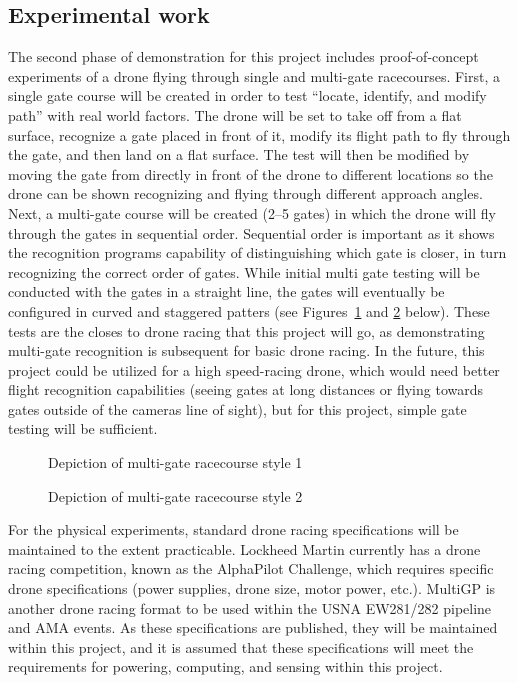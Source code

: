 \documentclass[onecolumn,10pt]{IEEEtran}
\begin{document}
\subsection{Experimental work}
The second phase of demonstration for this project includes proof-of-concept experiments of a drone flying through single and multi-gate racecourses. First, a single gate course will be created in order to test ``locate, identify, and modify path'' with real world factors. The drone will be set to take off from a flat surface, recognize a gate placed in front of it, modify its flight path to fly through the gate, and then land on a flat surface. The test will then be modified by moving the gate from directly in front of the drone to different locations so the drone can be shown recognizing and flying through different approach angles. Next, a multi-gate course will be created (2--5 gates) in which the drone will fly through the gates in sequential order. Sequential order is important as it shows the recognition programs capability of distinguishing which gate is closer, in turn recognizing the correct order of gates.  While initial multi gate testing will be conducted with the gates in a straight line, the gates will eventually be configured in curved and staggered patters (see Figures~\ref{fig-gate-style-1} and \ref{fig-gate-style-2} below). These tests are the closes to drone racing that this project will go, as demonstrating multi-gate recognition is subsequent for basic drone racing. In the future, this project could be utilized for a high speed-racing drone, which would need better flight recognition capabilities (seeing gates at long distances or flying towards gates outside of the cameras line of sight), but for this project, simple gate testing will be sufficient.
\begin{figure}
\caption{Depiction of multi-gate racecourse style 1}
\label{fig-gate-style-1}
\end{figure}

\begin{figure}
\caption{Depiction of multi-gate racecourse style 2}
\label{fig-gate-style-2}
\end{figure}

For the physical experiments, standard drone racing specifications will be maintained to the extent practicable. Lockheed Martin currently has a drone racing competition, known as the AlphaPilot Challenge, which requires specific drone specifications (power supplies, drone size, motor power, etc.). MultiGP is another drone racing format to be used within the USNA EW281/282 pipeline and AMA events.  As these specifications are published, they will be maintained within this project, and it is assumed that these specifications will meet the requirements for powering, computing, and sensing within this project.
\end{document}
